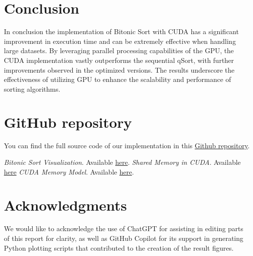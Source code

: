 \documentclass[a4paper,12pt]{article}
\begin{document}
\section{Conclusion}
In conclusion the implementation of Bitonic Sort with CUDA has a significant improvement in execution time and can be extremely effective when handling large datasets. By leveraging parallel processing capabilities of the GPU, the CUDA implementation vastly outperforms the sequential qSort, with further improvements observed in the optimized versions. The results underscore the effectiveness of utilizing GPU to enhance the scalability and performance of sorting algorithms.

\section*{GitHub repository}
You can find the full source code of our implementation in this \href {https://github.com/ekoumpar/bitonicSort_CUDA/tree/main}{Github repository}.

\begin{thebibliography}{9}

 \textit{Bitonic Sort Visualization}. Available \href{https://www.sortvisualizer.com/bitonicsort/}{here}.
 \textit{Shared Memory in CUDA}. Available 
\href{https://developer.nvidia.com/blog/using-shared-memory-cuda-cc/}{here}
 \textit{CUDA Memory Model}. Available \href{https://www.3dgep.com/cuda-memory-model/}{here}.
\end{thebibliography}

\section*{Acknowledgments}
We would like to acknowledge the use of ChatGPT for assisting in editing parts of this report for clarity, as well as GitHub Copilot for its support in generating Python plotting scripts that contributed to the creation of the result figures.
\end{document}

